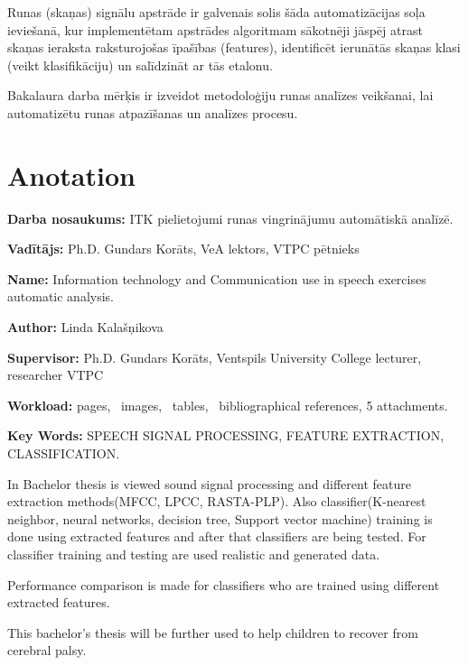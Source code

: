 \documentclass[12pt,paper=A4]{report}
\begin{document}
	Runas (skaņas) signālu apstrāde ir galvenais solis šāda automatizācijas soļa ieviešanā, kur implementētam apstrādes algoritmam sākotnēji jāspēj atrast skaņas ieraksta raksturojošas īpašības (features), identificēt ierunātās skaņas klasi (veikt klasifikāciju) un salīdzināt ar tās etalonu.

Bakalaura darba mērķis ir izveidot metodoloģiju runas analīzes veikšanai, lai automatizētu runas atpazīšanas un analīzes procesu. 




\chapter*{Anotation}

\textbf{Darba nosaukums:} ITK pielietojumi runas vingrinājumu automātiskā analīzē.



\textbf{Vadītājs:} Ph.D. Gundars Korāts, VeA lektors, VTPC pētnieks






\textbf{Name:}
Information technology and Communication use in speech exercises automatic analysis.

\textbf{Author:} Linda Kalašņikova

\textbf{Supervisor:}
Ph.D. Gundars Korāts, Ventspils University College lecturer, researcher VTPC

\textbf{Workload:} \pageref{LastPage} pages, \totalfigures\ images, \totaltables\ tables, \ bibliographical references, 5 attachments.

\textbf{Key Words:} SPEECH SIGNAL PROCESSING, FEATURE EXTRACTION, CLASSIFICATION.
\vspace{5mm}


In Bachelor thesis is viewed sound signal processing 
and different feature extraction methods(MFCC, LPCC, RASTA-PLP).
Also classifier(K-nearest neighbor, neural networks, 
decision tree, Support vector machine) training is done using extracted features 
and after that classifiers are being tested.  
For classifier training and testing are used realistic and generated data.
 
Performance comparison is made for classifiers who are trained using 
different extracted features. 

This bachelor's thesis will be further used to help children to recover
from cerebral palsy.
\end{document}
